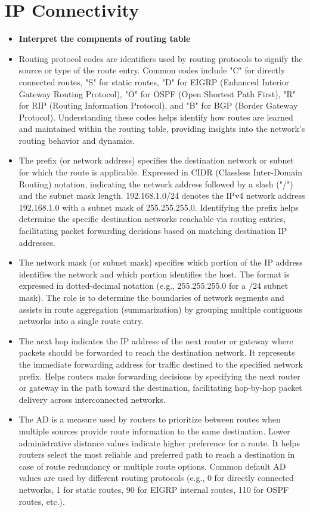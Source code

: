 \documentclass{article}
\begin{document}
\section{IP Connectivity}
\begin{itemize}
  \item \textbf{Interpret the compnents of routing table}
  	\item[] Routing protocol codes are identifiers used by routing protocols to signify the source or type of the route entry. Common codes include "C" for directly connected routes, "S" for static routes, "D" for EIGRP (Enhanced Interior Gateway Routing Protocol), "O" for OSPF (Open Shortest Path First), "R" for RIP (Routing Information Protocol), and "B" for BGP (Border Gateway Protocol). Understanding these codes helps identify how routes are learned and maintained within the routing table, providing insights into the network's routing behavior and dynamics.
	\item[] The prefix (or network address) specifies the destination network or subnet for which the route is applicable. Expressed in CIDR (Classless Inter-Domain Routing) notation, indicating the network address followed by a slash ("/") and the subnet mask length. 192.168.1.0/24 denotes the IPv4 network address 192.168.1.0 with a subnet mask of 255.255.255.0. Identifying the prefix helps determine the specific destination networks reachable via routing entries, facilitating packet forwarding decisions based on matching destination IP addresses.
	\item[] The network mask (or subnet mask) specifies which portion of the IP address identifies the network and which portion identifies the host. The format is expressed in dotted-decimal notation (e.g., 255.255.255.0 for a /24 subnet mask). The role is to determine the boundaries of network segments and assists in route aggregation (summarization) by grouping multiple contiguous networks into a single route entry.
	\item[] The next hop indicates the IP address of the next router or gateway where packets should be forwarded to reach the destination network. It represents the immediate forwarding address for traffic destined to the specified network prefix. Helps routers make forwarding decisions by specifying the next router or gateway in the path toward the destination, facilitating hop-by-hop packet delivery across interconnected networks.
	\item[] The AD is a measure used by routers to prioritize between routes when multiple sources provide route information to the same destination. Lower administrative distance values indicate higher preference for a route. It helps routers select the most reliable and preferred path to reach a destination in case of route redundancy or multiple route options. Common default AD values are used by different routing protocols (e.g., 0 for directly connected networks, 1 for static routes, 90 for EIGRP internal routes, 110 for OSPF routes, etc.).

\end{itemize}
\end{document}
